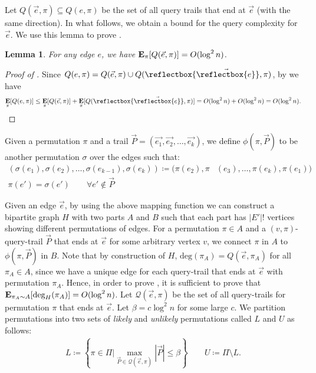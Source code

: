 \documentclass[letterpaper,11pt]{article}
\DeclareMathOperator{\E}{\ensuremath{\normalfont \textbf{E}}}
\newcommand{\cev}[1]{\reflectbox{\ensuremath{\vec{\reflectbox{\ensuremath{#1}}}}}}
\newtheorem{lemma}[theorem]{Lemma}
\newenvironment{myproof}{
\vspace{-0.5cm}
\begin{proof}
}{
\end{proof}
}
\begin{document}
Let $Q(\vec{e}, \pi) \subseteq Q(e, \pi)$ be the set of all query trails that end at $\vec{e}$ (with the same direction). In what follows, we obtain a bound for the query complexity for $\vec{e}$. We use this lemma to prove .


\begin{lemma}\label{lem: query-complexity-directed}
For any edge $e$, we have $\E_\pi[Q(\vec{e}, \pi)] = O(\log^2 n)$.
\end{lemma}

\begin{myproof}[Proof of ]
Since $Q(e, \pi) = Q(\vec{e}, \pi) \cup Q(\cev{e}, \pi)$, by  we have 
\begin{align*}
\E_\pi[Q(e, \pi)] \leq \E_\pi[Q(\vec{e}, \pi)] + \E_\pi[Q(\cev{e}, \pi)] = O(\log^2 n) + O(\log^2 n) = O(\log^2 n). \qedhere
\end{align*}
\end{myproof}



Given a permutation $\pi$ and a trail $\vec{P}=(\vec{e_1}, \vec{e_2}, \ldots, \vec{e_k})$, we define $\phi(\pi, \vec{P})$ to be another permutation $\sigma$ over the edges such that:
\begin{align*}
    (\sigma(e_1), \sigma(e_2), \ldots, \sigma(e_{k-1}), \sigma(e_k)) \coloneqq (\pi(e_2), \pi&(e_3), \ldots, \pi(e_{k}), \pi(e_{1}))\\
    \pi(e') = \sigma(e') \quad\quad \forall e' \notin \vec{P}
\end{align*}

Given an edge $\vec{e}$, by using the above mapping function we can construct a bipartite graph $H$ with two parts $A$ and $B$ such that each part has $|E'|!$ vertices showing different permutations of edges. For a permutation $\pi \in A$ and a $(v,\pi)$-query-trail $\vec{P}$ that ends at $\vec{e}$ for some arbitrary vertex $v$, we connect $\pi$ in $A$ to $\phi(\pi, \vec{P})$ in $B$. Note that by construction of $H$, $\text{deg}(\pi_A) = Q(\vec{e},\pi_A)$ for all $\pi_A \in A$, since we have a unique edge for each query-trail that ends at $\vec{e}$ with permutation $\pi_A$. Hence, in order to prove , it is sufficient to prove that $\E_{\pi_A \sim A}[\text{deg}_H(\pi_A)]=O(\log^2 n)$. Let $\mathcal{Q}(\vec{e}, \pi)$ be the set of all query-trails for permutation $\pi$ that ends at $\vec{e}$. Let $\beta = c \log^2 n$ for some large $c$. We partition permutations into two sets of {\em likely} and {\em unlikely} permutations called $L$ and $U$ as follows:
\begin{align*}
    L \coloneqq \left\{\pi \in \Pi \Big\lvert \max_{\vec{P} \in \mathcal{Q}(\vec{e}, \pi)} |\vec{P}| \leq \beta \right\} \quad\quad U \coloneqq \Pi \setminus L.
\end{align*}
\end{document}
